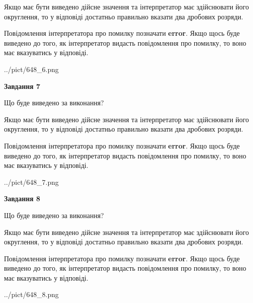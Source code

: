 \documentclass[12pt, ukrainian]{article}
\begin{document}
{\begin {Large}
Якщо має бути виведено дійсне значення та інтерпретатор має здійснювати його округлення, 
то у відповіді достатньо правильно вказати два дробових розряди.

Повідомлення інтерпретатора про помилку позначати \textbf{error}.
Якщо щось буде виведено до того, як інтерпретатор видасть повідомлення про помилку, 
то воно має вказуватись у відповіді. \par

\begin{center}
	{../pict/648_6.png}
\end{center}
\newpage

{\begin {center}\textbf{Завдання 7}\end {center}}\par
Що буде виведено за виконання? \par

Якщо має бути виведено дійсне значення та інтерпретатор має здійснювати його округлення, 
то у відповіді достатньо правильно вказати два дробових розряди.

Повідомлення інтерпретатора про помилку позначати \textbf{error}.
Якщо щось буде виведено до того, як інтерпретатор видасть повідомлення про помилку, 
то воно має вказуватись у відповіді. \par

\begin{center}
	{../pict/648_7.png}
\end{center}
\newpage

{\begin {center}\textbf{Завдання 8}\end {center}}\par
Що буде виведено за виконання? \par

Якщо має бути виведено дійсне значення та інтерпретатор має здійснювати його округлення, 
то у відповіді достатньо правильно вказати два дробових розряди.

Повідомлення інтерпретатора про помилку позначати \textbf{error}.
Якщо щось буде виведено до того, як інтерпретатор видасть повідомлення про помилку, 
то воно має вказуватись у відповіді. \par

\begin{center}
	{../pict/648_8.png}
\end{center}
\newpage


\end{Large}}
\end{document}
